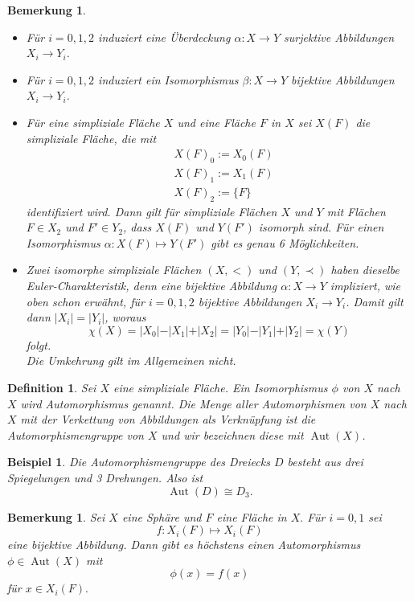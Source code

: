\documentclass[12pt,titlepage,twoside,cleardoublepage]{article}
\theoremstyle{nummermitklammern}
\newtheorem{bsp}[temp]{Beispiel}
\newtheorem{definition}[temp]{Definition}
\newtheorem{bemerkung}[temp]{Bemerkung}
\newtheorem{definition}[zahl]{Definition}
\newtheorem{bsp}[zahl]{Beispiel}
\newtheorem{bemerkung}[zahl]{Bemerkung}
\numberwithin{equation}{section}
\DeclareMathOperator{\Aut}{Aut}
\begin{document}
\begin{bemerkung}
\begin{itemize}
\item

Für $i=0,1,2$ induziert eine Überdeckung $\alpha:X\to Y$ surjektive Abbildungen $X_{i} \to Y_{i}$.
\item 
Für $i=0,1,2$ induziert ein Isomorphismus $\beta:X \to Y$  bijektive Abbildungen $X_{i} \to Y_{i}$.
\item
Für eine simpliziale Fläche $X$ und eine Fläche $F$ in $X$ sei $X(F)$ die simpliziale Fläche, die mit 
\begin{align*}
&X(F)_0:=X_0(F)\\
&X(F)_1:= X_1(F)\\
&X(F)_2:= \{F\} 
\end{align*}
 identifiziert wird.
Dann gilt für simpliziale Flächen $X$ und $Y$ mit Flächen $F \in X_2$ und $F' \in Y_2$, dass $X(F)$ und $Y(F')$ isomorph sind. Für einen Isomorphismus $\alpha : X(F)\mapsto Y(F')$ gibt es genau 6 Möglichkeiten.
\item
 Zwei isomorphe simpliziale Flächen $(X,<)$ und $(Y, \prec)$ haben dieselbe Euler-Charakteristik, denn eine bijektive Abbildung $\alpha:X \to Y$ impliziert, wie oben schon erwähnt, für $i=0,1,2$ bijektive Abbildungen  $X_i \to Y_i$. Damit gilt dann $\vert X_i \vert =\vert Y_i \vert $, woraus
 \[
\chi(X) =\vert X_0 \vert - \vert X_1\vert +\vert X_2 \vert = \vert Y_0 \vert - \vert Y_1\vert +\vert Y_2 \vert =\chi(Y)
 \]
 folgt. \\
 Die Umkehrung gilt im Allgemeinen nicht.
\end{itemize}
\end{bemerkung}
\begin{definition}
Sei $X$ eine simpliziale Fläche. Ein Isomorphismus $\phi$ von
$X$ nach $X$ wird \emph{Automorphismus} genannt. Die Menge aller Automorphismen von $X$ nach $X$ mit der Verkettung von Abbildungen als Verknüpfung ist die Automorphismengruppe von $X$ und wir bezeichnen diese mit $\Aut(X)$. 
\end{definition}
\begin{bsp}
Die Automorphismengruppe des Dreiecks $D$ besteht aus drei 
Spiegelungen und 3 Drehungen. Also ist
\[
\Aut(D)\cong D_3.
\]
\end{bsp}
\begin{bemerkung}
Sei $X$ eine Sphäre und $F$ eine Fläche in $X.$ Für $i=0,1$ sei 
\[
f:X_i(F)\mapsto X_i(F)  
\] 
eine bijektive Abbildung. Dann gibt es höchstens einen Automorphismus $\phi \in \Aut(X)$ mit 
\[
\phi(x)=f(x) 
\]
für $x\in X_i(F).$
\end{bemerkung}
\end{document}

